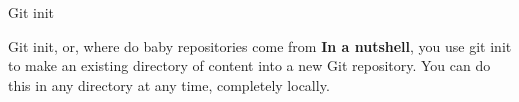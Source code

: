 \begin{frame}{Git init}
    \begin{block}{Git init, or, where do baby repositories come from}
    \textbf{In a nutshell}, you use git init to make an existing directory of content into a new Git repository.
    You can do this in any directory at any time, completely locally.
    
    \end{block}
    \pause
\end{frame}
